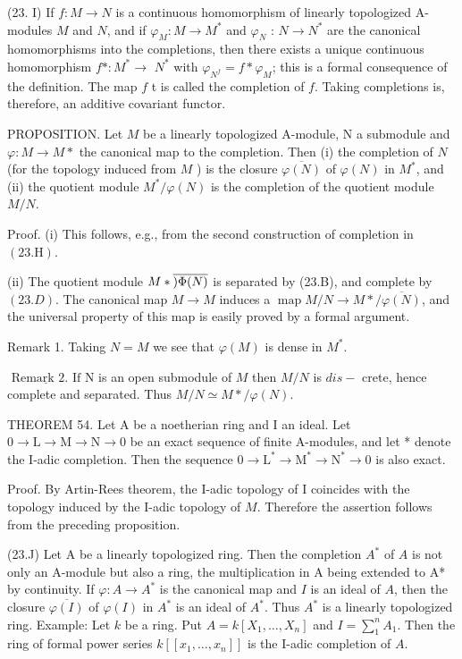 (23. I) If $f: M \rightarrow N$ is a continuous homomorphism of linearly topologized A-modules $M$ and $N$, and if $\varphi_{M}: M \rightarrow M^{*}$ and $\varphi_{N}$ : $N \rightarrow N^{*}$ are the canonical homomorphisms into the completions, then there exists a unique continuous homomorphism $f *: M^{*} \rightarrow$ $N^{*}$ with $\varphi_{N^{f}}=f * \varphi_{M}$; this is a formal consequence of the definition. The map $f$ t is called the completion of $f$. Taking completions is, therefore, an additive covariant functor.

PROPOSITION. Let $M$ be a linearly topologized A-module, N a submodule and $\varphi: M \rightarrow M *$ the canonical map to the completion. Then (i) the completion of $N$ (for the topology induced from $M$ ) is the closure $\overline{\varphi(N)}$ of $\varphi(N)$ in $M^{*}$, and (ii) the quotient module $M^{*} / \varphi(N)$ is the completion of the quotient module $M / N$.

Proof. (i) This follows, e.g., from the second construction of completion in $(23 . \mathrm{H})$.

(ii) The quotient module $M * \overline{\smash{)} \Phi ( N ) }$ is separated by (23.B), and complete by $(23 . D)$. The canonical map $M \rightarrow M$ induces a $\operatorname{map} M / N \rightarrow M * / \overline{\varphi(N)}$, and the universal property of this map is easily proved by a formal argument.

Remark 1. Taking $N=M$ we see that $\varphi(M)$ is dense in $M^{*} .$

$\underline{\text { Remark 2. If }} \mathrm{N}$ is an open submodule of $M$ then $M / N$ is $d i s-$ crete, hence complete and separated. Thus $M / N \simeq M * / \varphi(N)$.

THEOREM 54. Let A be a noetherian ring and I an ideal. Let $0 \rightarrow \mathrm{L} \rightarrow \mathrm{M} \rightarrow \mathrm{N} \rightarrow 0$ be an exact sequence of finite A-modules, and let * denote the I-adic completion. Then the sequence $0 \rightarrow \mathrm{L}^{*} \rightarrow \mathrm{M}^{*} \rightarrow \mathrm{N}^{*} \rightarrow 0$ is also exact.

Proof. By Artin-Rees theorem, the I-adic topology of I coincides with the topology induced by the I-adic topology of $M$. Therefore the assertion follows from the preceding proposition.

(23.J) Let A be a linearly topologized ring. Then the completion $A^{*}$ of $A$ is not only an A-module but also a ring, the multiplication in A being extended to A* by continuity. If $\varphi: A \rightarrow A^{*}$ is the canonical map and $I$ is an ideal of $A$, then the closure $\overline{\varphi(I)}$ of $\varphi(I)$ in $A^{*}$ is an ideal of $A^{*}$. Thus $A^{*}$ is a linearly topologized ring. Example: Let $k$ be a ring. Put $A=k\left[X_{1}, \ldots, X_{n}\right]$ and $I=\sum_{1}^{n} A_{1} .$ Then the ring of formal power series $k\left[\left[x_{1}, \ldots, x_{n}\right]\right]$ is the I-adic completion of $A$.

